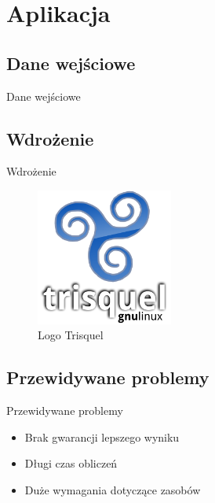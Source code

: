 \documentclass{beamer}
\begin{document}
\section{Aplikacja}

\subsection{Dane wejściowe}
\begin{frame}{Dane wejściowe}



\end{frame}


\subsection{Wdrożenie}
\begin{frame}{Wdrożenie} 
\begin{figure}
\includegraphics[width=0.4\textwidth]{img/trisquel}
\caption{Logo Trisquel\cite{trisquel}}
\end{figure}
\end{frame}


\subsection{Przewidywane problemy}
\begin{frame}{Przewidywane problemy} 

\begin{itemize}
\item Brak gwarancji lepszego wyniku
\item Długi czas obliczeń
\item Duże wymagania dotyczące zasobów
\end{itemize}

\end{frame}
\end{document}
